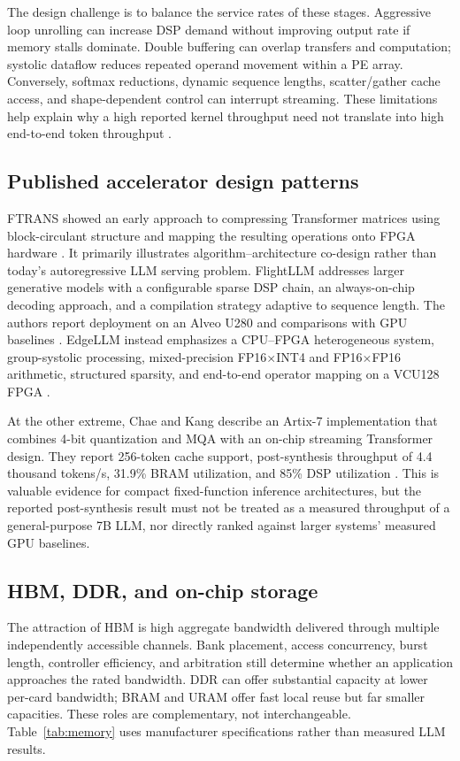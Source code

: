 \documentclass[conference,10pt]{IEEEtran}
\begin{document}
The design challenge is to balance the service rates of these stages. Aggressive loop unrolling can increase DSP demand without improving output rate if memory stalls dominate. Double buffering can overlap transfers and computation; systolic dataflow reduces repeated operand movement within a PE array. Conversely, softmax reductions, dynamic sequence lengths, scatter/gather cache access, and shape-dependent control can interrupt streaming. These limitations help explain why a high reported kernel throughput need not translate into high end-to-end token throughput \cite{blankestijn2026}.

\subsection{Published accelerator design patterns}
FTRANS showed an early approach to compressing Transformer matrices using block-circulant structure and mapping the resulting operations onto FPGA hardware \cite{li2020}. It primarily illustrates algorithm--architecture co-design rather than today's autoregressive LLM serving problem. FlightLLM addresses larger generative models with a configurable sparse DSP chain, an always-on-chip decoding approach, and a compilation strategy adaptive to sequence length. The authors report deployment on an Alveo U280 and comparisons with GPU baselines \cite{zeng2024}. EdgeLLM instead emphasizes a CPU--FPGA heterogeneous system, group-systolic processing, mixed-precision FP16$\times$INT4 and FP16$\times$FP16 arithmetic, structured sparsity, and end-to-end operator mapping on a VCU128 FPGA \cite{huang2025}.

At the other extreme, Chae and Kang describe an Artix-7 implementation that combines 4-bit quantization and MQA with an on-chip streaming Transformer design. They report 256-token cache support, post-synthesis throughput of 4.4 thousand tokens/s, 31.9\% BRAM utilization, and 85\% DSP utilization \cite{chae2025}. This is valuable evidence for compact fixed-function inference architectures, but the reported post-synthesis result must not be treated as a measured throughput of a general-purpose 7B LLM, nor directly ranked against larger systems' measured GPU baselines.

\subsection{HBM, DDR, and on-chip storage}
The attraction of HBM is high aggregate bandwidth delivered through multiple independently accessible channels. Bank placement, access concurrency, burst length, controller efficiency, and arbitration still determine whether an application approaches the rated bandwidth. DDR can offer substantial capacity at lower per-card bandwidth; BRAM and URAM offer fast local reuse but far smaller capacities. These roles are complementary, not interchangeable. Table~\ref{tab:memory} uses manufacturer specifications rather than measured LLM results.
\end{document}
